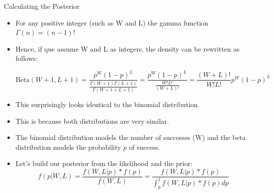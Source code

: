 \documentclass[handout]{beamer}
\begin{document}
\begin{frame}{Calculating the Posterior}
\scriptsize{

\begin{itemize}
\item For any positive integer (such as W and L) the gamma function $\Gamma(n) = (n-1)!$

\item Hence, if que assume W and L as integers, the density can be rewritten as follows:

\begin{displaymath}
\text{Beta}(W+1 , L+1) = \frac{p^W(1-p)^L}{\frac{\Gamma(W+1)\Gamma(L+1)}{\Gamma(W+1 + L+1)}} = \frac{p^W(1-p)^L}{\frac{W!L!}{(W+L)!}} = \frac{(W+L)!}{W!L!}p^W(1-p)^L
\end{displaymath}

\item This surprisingly looks identical to the binomial distribution.

\item This is because both distributions are very similar. 

\item The binomial distribution models the number of successes (W) and the beta distribution models the probability $p$ of success. 


\item Let's build our posterior from the likelihood and the prior:
\begin{displaymath}
f(p|W,L) = \frac{f(W,L|p)*f(p)}{f(W,L)} = \frac{f(W,L|p)*f(p)}{\int_0^1f(W,L|p)*f(p)dp} 
\end{displaymath}

\end{itemize}

} 

\end{frame}
\end{document}
